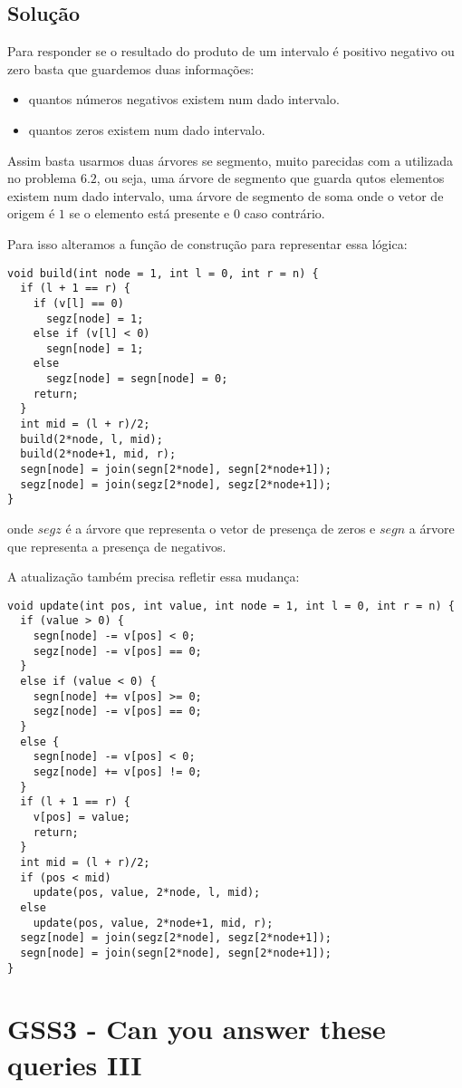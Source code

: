 \subsection{Solução}
Para responder se o resultado do produto de um intervalo é positivo negativo ou zero basta que guardemos duas informações:
\begin{itemize}
    \item quantos números negativos existem num dado intervalo.
    \item quantos zeros existem num dado intervalo.
\end{itemize}
Assim basta usarmos duas árvores se segmento, muito parecidas com a utilizada no problema $6.2$, ou seja, uma árvore de segmento que guarda qutos elementos existem num dado intervalo, uma árvore de segmento de soma onde o vetor de origem é $1$ se o elemento está presente e $0$ caso contrário.

Para isso alteramos a função de construção para representar essa lógica:
\begin{lstlisting}
void build(int node = 1, int l = 0, int r = n) {
  if (l + 1 == r) {
    if (v[l] == 0)
      segz[node] = 1;
    else if (v[l] < 0)
      segn[node] = 1;
    else
      segz[node] = segn[node] = 0;
    return;
  }
  int mid = (l + r)/2;
  build(2*node, l, mid);
  build(2*node+1, mid, r);
  segn[node] = join(segn[2*node], segn[2*node+1]);
  segz[node] = join(segz[2*node], segz[2*node+1]);
}
\end{lstlisting}
onde $segz$ é a árvore que representa o vetor de presença de zeros e $segn$ a árvore que representa a presença de negativos.

A atualização também precisa refletir essa mudança:
\begin{lstlisting}
void update(int pos, int value, int node = 1, int l = 0, int r = n) {
  if (value > 0) {
    segn[node] -= v[pos] < 0;
    segz[node] -= v[pos] == 0;
  }
  else if (value < 0) {
    segn[node] += v[pos] >= 0;
    segz[node] -= v[pos] == 0;
  }
  else {
    segn[node] -= v[pos] < 0;
    segz[node] += v[pos] != 0;
  }
  if (l + 1 == r) {
    v[pos] = value;
    return;
  }
  int mid = (l + r)/2;
  if (pos < mid)
    update(pos, value, 2*node, l, mid);
  else
    update(pos, value, 2*node+1, mid, r);
  segz[node] = join(segz[2*node], segz[2*node+1]);
  segn[node] = join(segn[2*node], segn[2*node+1]);
}
\end{lstlisting}

\section{GSS3 - Can you answer these queries III}

